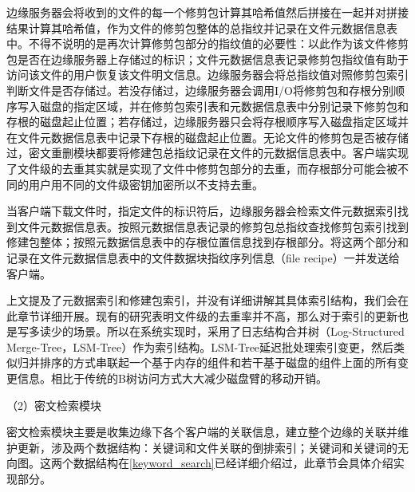 \documentclass[promaster]{thesis-uestc}
\begin{document}
边缘服务器会将收到的文件的每一个修剪包计算其哈希值然后拼接在一起并对拼接结果计算其哈希值，作为文件的修剪包整体的总指纹并记录在文件元数据信息表中。不得不说明的是再次计算修剪包部分的指纹值的必要性：以此作为该文件修剪包是否在边缘服务器上存储过的标识；文件元数据信息表记录修剪包指纹值有助于访问该文件的用户恢复该文件明文信息。边缘服务器会将总指纹值对照修剪包索引判断文件是否存储过。若没存储过，边缘服务器会调用I/O将修剪包和存根分别顺序写入磁盘的指定区域，并在修剪包索引表和元数据信息表中分别记录下修剪包和存根的磁盘起止位置；若存储过，边缘服务器只会将存根顺序写入磁盘指定区域并在文件元数据信息表中记录下存根的磁盘起止位置。无论文件的修剪包是否被存储过，密文重删模块都要将修建包总指纹记录在文件的元数据信息表中。客户端实现了文件级的去重其实就是实现了文件中修剪包部分的去重，而存根部分可能会被不同的用户用不同的文件级密钥加密所以不支持去重。

当客户端下载文件时，指定文件的标识符后，边缘服务器会检索文件元数据索引找到文件元数据信息表。按照元数据信息表记录的修剪包总指纹查找修剪包索引找到修建包整体；按照元数据信息表中的存根位置信息找到存根部分。将这两个部分和记录在文件元数据信息表中的文件数据块指纹序列信息（file recipe）一并发送给客户端。

上文提及了元数据索引和修建包索引，并没有详细讲解其具体索引结构，我们会在此章节详细开展。现有的研究表明文件级的去重率并不高，那么对于索引的更新也是写多读少的场景。所以在系统实现时，采用了日志结构合并树（Log-Structured Merge-Tree，LSM-Tree）作为索引结构。LSM-Tree延迟批处理索引变更，然后类似归并排序的方式串联起一个基于内存的组件和若干基于磁盘的组件上面的所有变更信息。相比于传统的B树访问方式大大减少磁盘臂的移动开销。

（2）密文检索模块

密文检索模块主要是收集边缘下各个客户端的关联信息，建立整个边缘的关联并维护更新，涉及两个数据结构：关键词和文件关联的倒排索引；关键词和关键词的无向图。这两个数据结构在\ref{keyword_search}已经详细介绍过，此章节会具体介绍实现部分。
\end{document}
